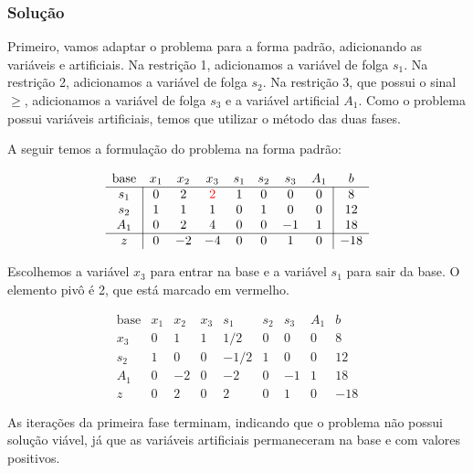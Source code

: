 \documentclass{article}
\begin{document}
\subsubsection{Solução}

Primeiro, vamos adaptar o problema para a forma padrão, adicionando as variáveis e artificiais.
Na restrição 1, adicionamos a variável de folga $s_1$.
Na restrição 2, adicionamos a variável de folga $s_2$.
Na restrição 3, que possui o sinal \(\geq\), adicionamos a variável de folga $s_3$ e a variável artificial $A_1$.
Como o problema possui variáveis artificiais, temos que utilizar o método das duas fases.

A seguir temos a formulação do problema na forma padrão:

\[
  \begin{array}{c|ccccccc|c}
    \text{base} & x_1 & x_2 &                         x_3 & s_1 & s_2 & s_3 & A_1 &   b \\ \hline
            s_1 &   0 &   2 & \color{red} 2 \color{black} &   1 &   0 &   0 &   0 &   8 \\
            s_2 &   1 &   1 &                           1 &   0 &   1 &   0 &   0 &  12 \\
            A_1 &   0 &   2 &                           4 &   0 &   0 &  -1 &   1 &  18 \\ \hline
              z &   0 &  -2 &                          -4 &   0 &   0 &   1 &   0 & -18
  \end{array}
\]

Escolhemos a variável \(x_3\) para entrar na base e a variável $s_1$ para sair da base. O elemento pivô é 2, que está marcado em vermelho.

\[
  \begin{array}{c|ccccccc|c}
    \text{base} & x_1 & x_2 & x_3 & s_1 & s_2 & s_3 & A_1 &   b \\ \hline
            x_3 &   0 &   1 &   1 &  1/2 &   0 &   0 &   0 &   8 \\
            s_2 &   1 &   0 &   0 & -1/2 &   1 &   0 &   0 &  12 \\
            A_1 &   0 &  -2 &   0 &  -2 &   0 &  -1 &   1 &  18 \\ \hline
              z &   0 &   2 &   0 &   2 &   0 &   1 &   0 & -18
  \end{array}
\]

As iterações da primeira fase terminam, indicando que o problema não possui solução viável, já que as variáveis artificiais permaneceram na base e com valores positivos.
\end{document}

